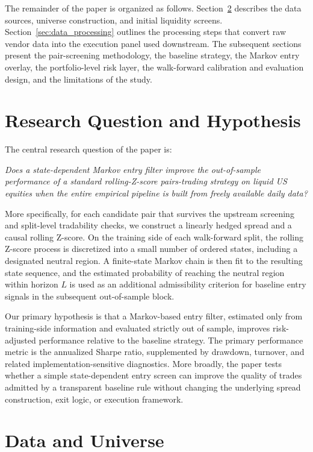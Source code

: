 \documentclass[11pt,a4paper]{article}
\begin{document}
The remainder of the paper is organized as follows. Section~\ref{sec:data_universe}
describes the data sources, universe construction, and initial liquidity screens.
Section~\ref{sec:data_processing} outlines the processing steps that convert raw
vendor data into the execution panel used downstream. The subsequent sections
present the pair-screening methodology, the baseline strategy, the Markov entry
overlay, the portfolio-level risk layer, the walk-forward calibration and evaluation
design, and the limitations of the study.

\section{Research Question and Hypothesis}

The central research question of the paper is:

\emph{Does a state-dependent Markov entry filter improve the out-of-sample performance of a standard rolling-Z-score pairs-trading strategy on liquid US equities when the entire empirical pipeline is built from freely available daily data?}

More specifically, for each candidate pair that survives the upstream screening
and split-level tradability checks, we construct a linearly hedged spread and
a causal rolling Z-score. On the training side of each walk-forward split, the
rolling Z-score process is discretized into a small number of ordered states,
including a designated neutral region. A finite-state Markov chain is then fit
to the resulting state sequence, and the estimated probability of reaching the
neutral region within horizon \(L\) is used as an additional admissibility
criterion for baseline entry signals in the subsequent out-of-sample block.

Our primary hypothesis is that a Markov-based entry filter, estimated only from
training-side information and evaluated strictly out of sample, improves
risk-adjusted performance relative to the baseline strategy. The primary
performance metric is the annualized Sharpe ratio, supplemented by drawdown,
turnover, and related implementation-sensitive diagnostics. More broadly, the
paper tests whether a simple state-dependent entry screen can improve the
quality of trades admitted by a transparent baseline rule without changing the
underlying spread construction, exit logic, or execution framework.


\section{Data and Universe}\label{sec:data_universe}
\end{document}
